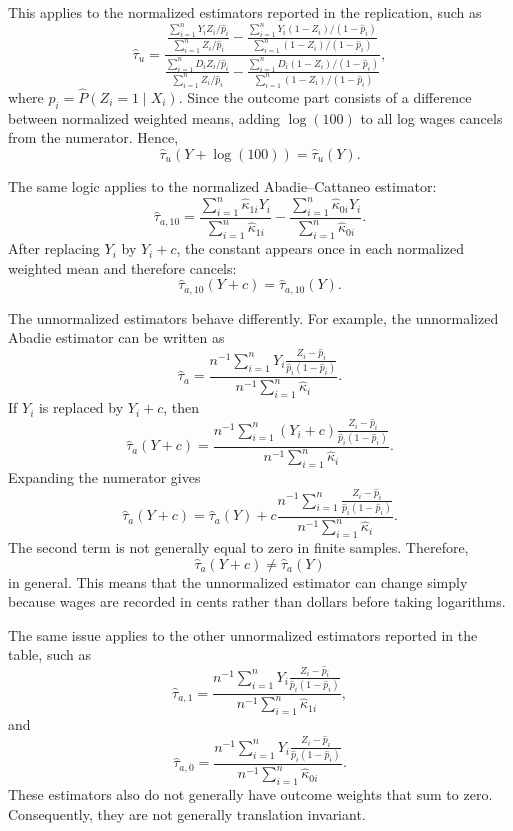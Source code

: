 \documentclass[11pt,a4paper]{article}
\begin{document}
This applies to the normalized estimators reported in the replication, such as
\[
    \hat{\tau}_u
    =
    \frac{
    \frac{\sum_{i=1}^n Y_i Z_i / \hat{p}_i}
         {\sum_{i=1}^n Z_i / \hat{p}_i}
    -
    \frac{\sum_{i=1}^n Y_i (1-Z_i) / (1-\hat{p}_i)}
         {\sum_{i=1}^n (1-Z_i) / (1-\hat{p}_i)}
    }{
    \frac{\sum_{i=1}^n D_i Z_i / \hat{p}_i}
         {\sum_{i=1}^n Z_i / \hat{p}_i}
    -
    \frac{\sum_{i=1}^n D_i (1-Z_i) / (1-\hat{p}_i)}
         {\sum_{i=1}^n (1-Z_i) / (1-\hat{p}_i)}
    },
\]
where \(\hat{p}_i = \hat{P}(Z_i=1 \mid X_i)\). Since the outcome part consists of
a difference between normalized weighted means, adding \(\log(100)\) to all
log wages cancels from the numerator. Hence,
\[
    \hat{\tau}_u(Y+\log(100)) = \hat{\tau}_u(Y).
\]

The same logic applies to the normalized Abadie--Cattaneo estimator:
\[
    \hat{\tau}_{a,10}
    =
    \frac{\sum_{i=1}^n \hat{\kappa}_{1i}Y_i}
         {\sum_{i=1}^n \hat{\kappa}_{1i}}
    -
    \frac{\sum_{i=1}^n \hat{\kappa}_{0i}Y_i}
         {\sum_{i=1}^n \hat{\kappa}_{0i}}.
\]
After replacing \(Y_i\) by \(Y_i+c\), the constant appears once in each
normalized weighted mean and therefore cancels:
\[
    \hat{\tau}_{a,10}(Y+c)
    =
    \hat{\tau}_{a,10}(Y).
\]

The unnormalized estimators behave differently. For example, the unnormalized
Abadie estimator can be written as
\[
    \hat{\tau}_a
    =
    \frac{
    n^{-1}\sum_{i=1}^n
    Y_i
    \frac{Z_i-\hat{p}_i}{\hat{p}_i(1-\hat{p}_i)}
    }{
    n^{-1}\sum_{i=1}^n \hat{\kappa}_i
    }.
\]
If \(Y_i\) is replaced by \(Y_i+c\), then
\[
    \hat{\tau}_a(Y+c)
    =
    \frac{
    n^{-1}\sum_{i=1}^n
    (Y_i+c)
    \frac{Z_i-\hat{p}_i}{\hat{p}_i(1-\hat{p}_i)}
    }{
    n^{-1}\sum_{i=1}^n \hat{\kappa}_i
    }.
\]
Expanding the numerator gives
\[
    \hat{\tau}_a(Y+c)
    =
    \hat{\tau}_a(Y)
    +
    c
    \frac{
    n^{-1}\sum_{i=1}^n
    \frac{Z_i-\hat{p}_i}{\hat{p}_i(1-\hat{p}_i)}
    }{
    n^{-1}\sum_{i=1}^n \hat{\kappa}_i
    }.
\]
The second term is not generally equal to zero in finite samples. Therefore,
\[
    \hat{\tau}_a(Y+c)
    \neq
    \hat{\tau}_a(Y)
\]
in general. This means that the unnormalized estimator can change simply because
wages are recorded in cents rather than dollars before taking logarithms.

The same issue applies to the other unnormalized estimators reported in the
table, such as
\[
    \hat{\tau}_{a,1}
    =
    \frac{
    n^{-1}\sum_{i=1}^n
    Y_i
    \frac{Z_i-\hat{p}_i}{\hat{p}_i(1-\hat{p}_i)}
    }{
    n^{-1}\sum_{i=1}^n \hat{\kappa}_{1i}
    },
\]
and
\[
    \hat{\tau}_{a,0}
    =
    \frac{
    n^{-1}\sum_{i=1}^n
    Y_i
    \frac{Z_i-\hat{p}_i}{\hat{p}_i(1-\hat{p}_i)}
    }{
    n^{-1}\sum_{i=1}^n \hat{\kappa}_{0i}
    }.
\]
These estimators also do not generally have outcome weights that sum to zero.
Consequently, they are not generally translation invariant.
\end{document}
